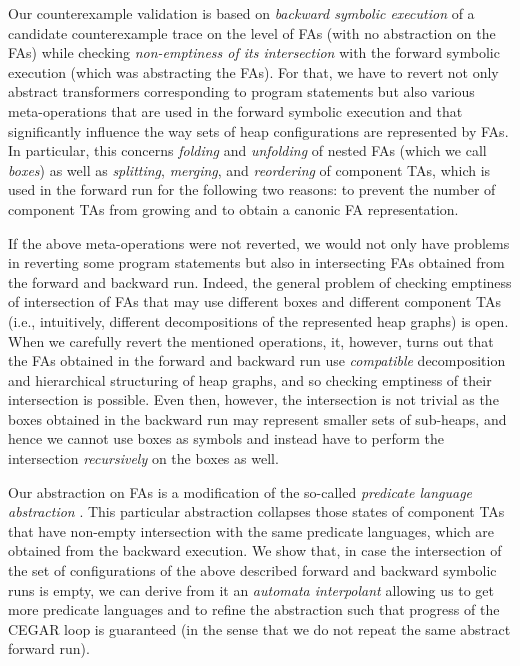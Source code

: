 {%

Our counterexample validation is based on \emph{backward symbolic execution} of
a candidate counterexample trace on the level of FAs (with no abstraction on the
FAs) while checking \emph{non-emptiness of its intersection} with the forward
symbolic execution (which was abstracting the FAs). For that, we have to revert
not only abstract transformers corresponding to program statements but also
various meta-operations that are used in the forward symbolic execution and that
significantly influence the way sets of heap configurations are represented by
FAs. In particular, this concerns \emph{folding} and \emph{unfolding} of nested
FAs (which we call \emph{boxes}) as well as \emph{splitting}, \emph{merging},
and \emph{reordering} of component TAs, which is used in the forward run for the
following two reasons: to
prevent the number of component TAs from growing and to obtain a canonic
FA representation. 

If the above meta-operations were not reverted, we would not only have problems
in reverting some program statements but also in intersecting FAs obtained from
the forward and backward run. Indeed, the general problem of checking emptiness
of intersection of FAs that may use different boxes and different component TAs
(i.e., intuitively, different decompositions of the represented heap graphs) is
open. When we carefully revert the mentioned operations, it, however, turns out
that the FAs obtained in the forward and backward run use \emph{compatible}
decomposition and hierarchical structuring of heap graphs, and so checking
emptiness of their intersection is possible. Even then, however, the
intersection is not trivial as the boxes obtained in the backward run may
represent smaller sets of sub-heaps, and hence we cannot use boxes as symbols
and instead have to perform the intersection \emph{recursively} on the boxes as
well.

Our abstraction on FAs is a modification of the so-called \emph{predicate
language abstraction} \cite{artmc}.
This particular abstraction collapses those states of component TAs that
have non-empty intersection with the same predicate languages, which are
obtained from the backward execution.
We show that, in
case the intersection of the set of configurations of the above described forward and backward symbolic runs
is empty, we can derive from it an \emph{automata interpolant} allowing us to
get more predicate languages and to refine the abstraction such that progress of
the CEGAR loop is guaranteed (in the sense that  we do not repeat the same
abstract forward run).

}
